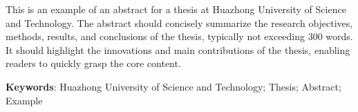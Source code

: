 
This is an example of an abstract for a thesis at Huazhong University of Science and Technology. The abstract should concisely summarize the research objectives, methods, results, and conclusions of the thesis, typically not exceeding 300 words. It should highlight the innovations and main contributions of the thesis, enabling readers to quickly grasp the core content.

{\sihao \textbf{Keywords}}: Huazhong University of Science and Technology; Thesis; Abstract; Example